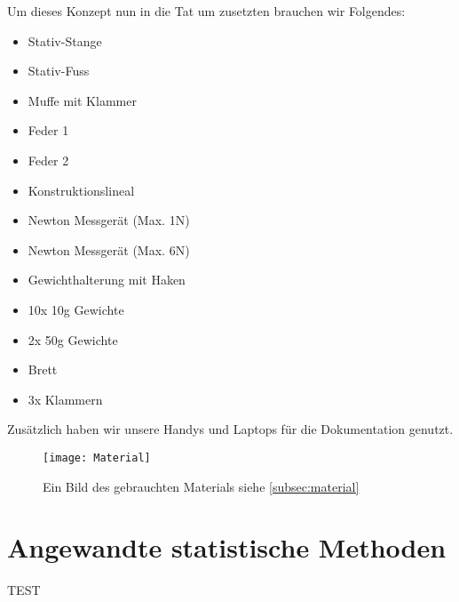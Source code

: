 \documentclass[../main.tex]{subfiles} %
\begin{document}
            Um dieses Konzept nun in die Tat um zusetzten brauchen wir Folgendes:
            \begin{itemize}
                \item Stativ-Stange
                \item Stativ-Fuss
                \item Muffe mit Klammer
                \item Feder 1
                \item Feder 2
                \item Konstruktionslineal
                \item Newton Messgerät (Max. 1N)
                \item Newton Messgerät (Max. 6N)
                \item Gewichthalterung mit Haken
                \item 10x 10g Gewichte
                \item 2x 50g Gewichte
                \item Brett
                \item 3x Klammern
            \end{itemize}
            \noindent
            Zusätzlich haben wir unsere Handys und Laptops für die Dokumentation genutzt.

            \begin{figure}[h]
                \centering
                \texttt{[image: Material]}
                \caption{Ein Bild des gebrauchten Materials siehe \ref{subsec:material}}
                \label{fig:material}
            \end{figure}


    \section{Angewandte statistische Methoden}\label{sec:angewandte-statistische-methoden}

    TEST
\end{document}
